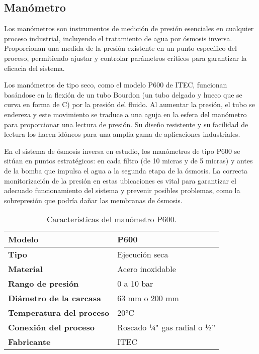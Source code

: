 

\subsection{Manómetro} \label{sec:indicador_manometro}

Los manómetros son instrumentos de medición de presión esenciales en cualquier proceso industrial, incluyendo el tratamiento de agua por ósmosis inversa. Proporcionan una medida de la presión existente en un punto específico del proceso, permitiendo ajustar y controlar parámetros críticos para garantizar la eficacia del sistema.

Los manómetros de tipo seco, como el modelo P600 de ITEC, funcionan basándose en la flexión de un tubo Bourdon (un tubo delgado y hueco que se curva en forma de C) por la presión del fluido. Al aumentar la presión, el tubo se endereza y este movimiento se traduce a una aguja en la esfera del manómetro para proporcionar una lectura de presión. Su diseño resistente y su facilidad de lectura los hacen idóneos para una amplia gama de aplicaciones industriales.

En el sistema de ósmosis inversa en estudio, los manómetros de tipo P600 se sitúan en puntos estratégicos: en cada filtro (de 10 micras y de 5 micras) y antes de la bomba que impulsa el agua a la segunda etapa de la ósmosis. La correcta monitorización de la presión en estas ubicaciones es vital para garantizar el adecuado funcionamiento del sistema y prevenir posibles problemas, como la sobrepresión que podría dañar las membranas de ósmosis.




\begin{table}[H]
    \centering
    \caption{Características del manómetro P600.}
    \label{table:manometro}
    \begin{tabular}{| L{6cm} | L{6cm} |}

        \hline
        \textbf{Modelo}                  & P600                        \\
        \hline
        \textbf{Tipo}                    & Ejecución seca              \\
        \hline
        \textbf{Material}                & Acero inoxidable            \\
        \hline
        \textbf{Rango de presión}        & 0 a 10 bar                  \\
        \hline
        \textbf{Diámetro de la carcasa}  & 63 mm o 200 mm              \\
        \hline
        \textbf{Temperatura del proceso} & 20°C                        \\
        \hline
        \textbf{Conexión del proceso}    & Roscado ¼" gas radial o ½'' \\
        \hline
        \textbf{Fabricante}              & ITEC                        \\
        \hline
    \end{tabular}
\end{table}


